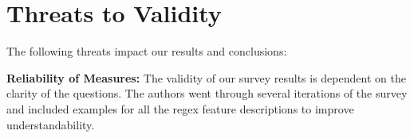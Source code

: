 \documentclass{sig-alternate-05-2015}
\begin{document}
\begin{abstract}
%

\end{abstract}













\section{Threats to Validity}
\label{sec:threats}
The following threats impact our results and conclusions:

\textbf{Reliability of Measures:} The validity of our survey results is dependent on the clarity of the questions. The authors went through several iterations of the survey and included examples for all the regex feature descriptions to improve understandability.
\end{document}
